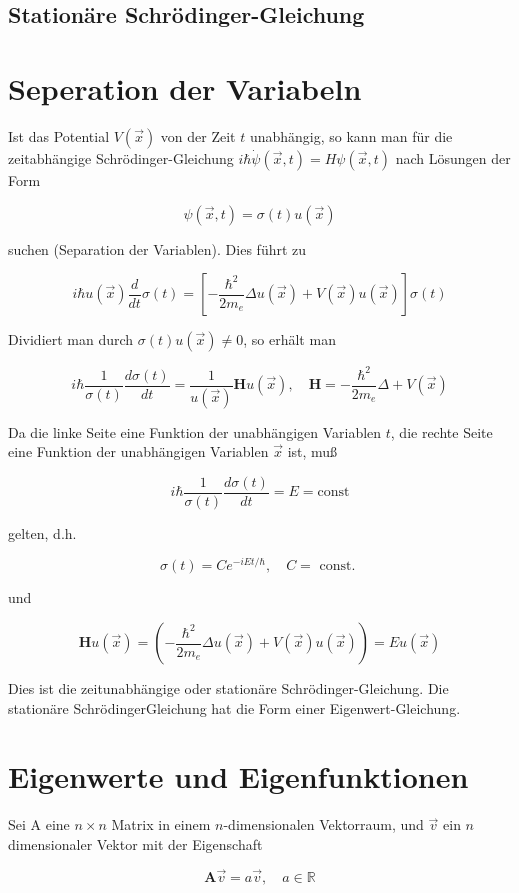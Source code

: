 \documentclass[10pt, letterpaper]{article}
\begin{document}
\subsection*{Stationäre Schrödinger-Gleichung}
\section*{Seperation der Variabeln}
Ist das Potential $V(\vec{x})$ von der Zeit $t$ unabhängig, so kann man für die zeitabhängige Schrödinger-Gleichung $i \hbar \dot{\psi}(\vec{x}, t)=H \psi(\vec{x}, t)$ nach Lösungen der Form

$$
\psi(\vec{x}, t)=\sigma(t) u(\vec{x})
$$

suchen (Separation der Variablen). Dies führt zu

$$
i \hbar u(\vec{x}) \frac{d}{d t} \sigma(t)=\left[-\frac{\hbar^{2}}{2 m_{e}} \Delta u(\vec{x})+V(\vec{x}) u(\vec{x})\right] \sigma(t)
$$

Dividiert man durch $\sigma(t) u(\vec{x}) \neq 0$, so erhält man

$$
i \hbar \frac{1}{\sigma(t)} \frac{d \sigma(t)}{d t}=\frac{1}{u(\vec{x})} \mathbf{H} u(\vec{x}), \quad \mathbf{H}=-\frac{\hbar^{2}}{2 m_{e}} \Delta+V(\vec{x})
$$

Da die linke Seite eine Funktion der unabhängigen Variablen $t$, die rechte Seite eine Funktion der unabhängigen Variablen $\vec{x}$ ist, muß

$$
i \hbar \frac{1}{\sigma(t)} \frac{d \sigma(t)}{d t}=E=\mathrm{const}
$$

gelten, d.h.

$$
\sigma(t)=C e^{-i E t / \hbar}, \quad C=\text { const. }
$$

und

$$
\mathbf{H} u(\vec{x})=\left(-\frac{\hbar^{2}}{2 m_{e}} \Delta u(\vec{x})+V(\vec{x}) u(\vec{x})\right)=E u(\vec{x})
$$

Dies ist die zeitunabhängige oder stationäre Schrödinger-Gleichung. Die stationäre SchrödingerGleichung hat die Form einer Eigenwert-Gleichung.

\section*{Eigenwerte und Eigenfunktionen}
Sei A eine $n \times n$ Matrix in einem $n$-dimensionalen Vektorraum, und $\vec{v}$ ein $n$ dimensionaler Vektor mit der Eigenschaft

$$
\mathbf{A} \vec{v}=a \vec{v}, \quad a \in \mathbb{R}
$$
\end{document}
